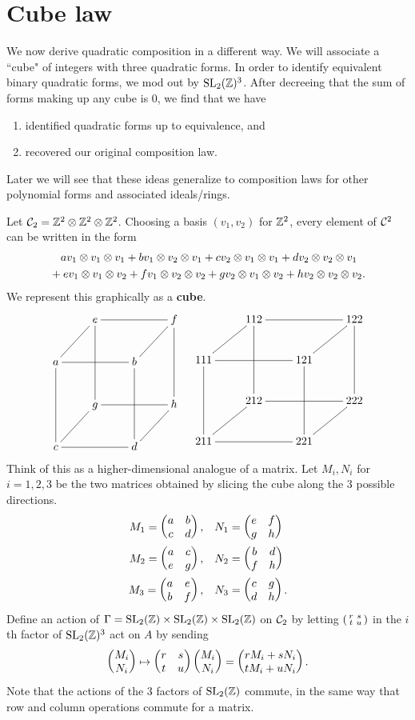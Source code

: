\section{Cube law}
We now derive quadratic composition in a different way. We will associate a ``cube" of integers with three quadratic forms. In order to identify equivalent binary quadratic forms, we mod out by $\SL_2(\Z)^3$. After decreeing that the sum of forms making up any cube is 0, we find that we have
\begin{enumerate}
\item identified quadratic forms up to equivalence, and
\item recovered our original composition law.
\end{enumerate}
Later we will see that these ideas generalize to composition laws for other polynomial forms and associated ideals/rings.

Let $\cal C_2=\Z^2\otimes \Z^2\ot\Z^2$. Choosing a basis $(v_1,v_2)$ for $\Z^2$, every element of $\cal C^2$ can be written in the form
\begin{align*}
&\quad av_1\otimes v_1\ot v_1 + bv_1\ot v_2\ot v_1 +c v_2\ot v_1\ot v_1 +d v_2\ot v_2\ot v_1\\
&+ev_1\otimes v_1\ot v_2 + fv_1\ot v_2\ot v_2 +g v_2\ot v_1\ot v_2 +h v_2\ot v_2\ot v_2.
\end{align*}
We represent this graphically as a \textbf{cube}.
\[
\xymatrix{
& e \ar@{-}[rr]\ar@{-}[dd] & & f \ar@{-}[dd]\\
a \ar@{-}[ur] \ar@{-}[rr] \ar@{-}[dd] & & b \ar@{-}[ur]\ar@{-}[dd] & \\
& g \ar@{-}[rr] & & h \\
c \ar@{-}[ur] \ar@{-}[rr] & & d \ar@{-}[ur] &
}
\quad
\xymatrix{
& 112 \ar@{-}[rr]\ar@{-}[dd] & & 122 \ar@{-}[dd]\\
111 \ar@{-}[ur] \ar@{-}[rr] \ar@{-}[dd] & & 121 \ar@{-}[ur]\ar@{-}[dd] & \\
& 212 \ar@{-}[rr] & & 222 \\
211 \ar@{-}[ur] \ar@{-}[rr] & & 221 \ar@{-}[ur] &
}
\]
Think of this as a higher-dimensional analogue of a matrix. Let $M_i,N_i$ for $i=1,2,3$ be the two matrices obtained by slicing the cube along the 3 possible directions.
\begin{align*}
M_1=\matt abcd,&\quad N_1=\matt efgh\\
M_2=\matt aceg,&\quad N_2=\matt bdfh\\
M_3=\matt aebf,&\quad N_3=\matt cgdh.
\end{align*}
Define an action of $\Ga=\SL_2(\Z)\times\SL_2(\Z)\times\SL_2(\Z)$ on $\cal C_2$ by letting $\smatt rstu$ in the $i$th factor of $\SL_2(\Z)^3$ act on $A$ by sending
\[
\coltwo{M_i}{N_i}\mapsto \matt rstu\coltwo{M_i}{N_i}=\coltwo{rM_i+sN_i}{tM_i+uN_i}.
\]
Note that the actions of the 3 factors of $\SL_2(\Z)$ commute, in the same way that row and column operations commute for a matrix.

